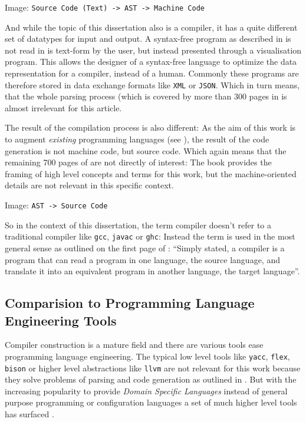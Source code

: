 Image: \texttt{Source Code (Text) -> AST -> Machine Code}

And while the topic of this dissertation also is a compiler, it has a quite different set of datatypes for input and output. A syntax-free program as described in  is not read in is text-form by the user, but instead presented through a visualisation program. This allows the designer of a syntax-free language to optimize the data representation for a compiler, instead of a human. Commonly these programs are therefore stored in data exchange formats like \texttt{XML} or \texttt{JSON}. Which in turn means, that the whole parsing process (which is covered by more than 300 pages in \cite{dragon_book} is almost irrelevant for this article.

The result of the compilation process is also different: As the aim of this work is to augment \textit{existing} programming languages (see ), the result of the code generation is not machine code, but source code. Which again means that the remaining 700 pages of \cite{dragon_book} are not directly of interest: The book provides the framing of high level concepts and terms for this work, but the machine-oriented details are not relevant in this specific context.

Image: \texttt{AST -> Source Code}

So in the context of this dissertation, the term compiler doesn't refer to a traditional compiler like \texttt{gcc}, \texttt{javac} or \texttt{ghc}: Instead the term is used in the most general sense as outlined on the first page of \cite{dragon_book}: \enquote{Simply stated, a compiler is a program that can read a program in one language, the source language, and translate it into an equivalent program in another language, the target language}.

\subsection{Comparision to Programming Language Engineering Tools}

Compiler construction is a mature field and there are various tools ease programming language engineering. The typical low level tools like \texttt{yacc}, \texttt{flex}, \texttt{bison} or higher level abstractions like \texttt{llvm} are not relevant for this work because they solve problems of parsing and code generation as outlined in . But with the increasing popularity to provide \textit{Domain Specific Languages} instead of general purpose programming or configuration languages a set of much higher level tools has surfaced \cite{mernik_dsl_2005}.

